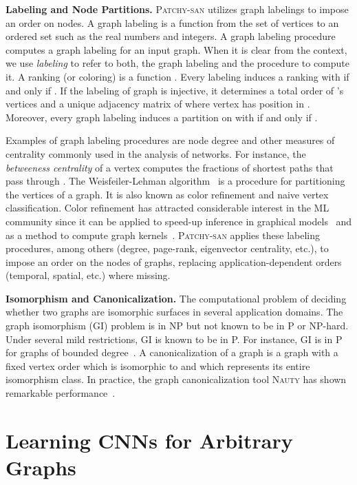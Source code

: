 \documentclass{article}
\newcommand{\patchysan}{{\textsc{Patchy-san}}\xspace}
\newcommand{\nauty}{{\textsc{Nauty}}\xspace}
\begin{document}
\textbf{Labeling and Node Partitions.}
\textsc{Patchy-san} utilizes graph labelings to impose an order on nodes. 
A graph labeling  is a function   from the set of vertices  to an ordered set  such as the real numbers and integers. A graph labeling procedure computes a graph labeling for an input graph. When it is clear from the context, we use \emph{labeling} to refer to both, the graph labeling and the  procedure to compute it.  A ranking (or coloring) is a function . Every labeling induces a ranking  with  if and only if . If the labeling  of graph  is injective, it determines a total order of 's vertices and a unique adjacency matrix  of  where vertex  has position  in . Moreover, every graph labeling induces a partition  on   with  if and only if . 

Examples of graph labeling procedures are node degree and other measures of centrality commonly used in the analysis of networks. For instance, the \emph{betweeness centrality} of a vertex  computes the fractions of shortest paths that pass through . The Weisfeiler-Lehman algorithm~\cite{weisfeiler:1968,douglas2011weisfeiler} is a procedure for partitioning the vertices of a graph. It is also known as color refinement and naive vertex classification. Color refinement has attracted considerable interest in the ML community since it can be applied to speed-up inference in graphical models~\cite{Kersting:2009,Kersting:2014} and as a method to compute graph kernels~\cite{Shervashidze:2011}. \patchysan applies these labeling procedures, among others (degree, page-rank, eigenvector centrality, etc.), to impose an order on the nodes of graphs, replacing application-dependent orders (temporal, spatial, etc.) where missing.

\textbf{Isomorphism and Canonicalization.}
The computational problem of deciding whether two graphs are isomorphic surfaces in several application domains. The graph isomorphism (GI) problem is in NP but not known to be in P or NP-hard. Under several mild restrictions, GI is known to be in P. For instance, GI is in P for graphs of bounded degree~\cite{luks:1982}. A canonicalization of a graph  is a graph  with a fixed vertex order which is isomorphic to  and which represents its entire isomorphism class. In practice, the graph canonicalization tool \nauty has shown remarkable performance~\cite{McKay:2014}.



\section{Learning CNNs for Arbitrary Graphs}
\end{document}
